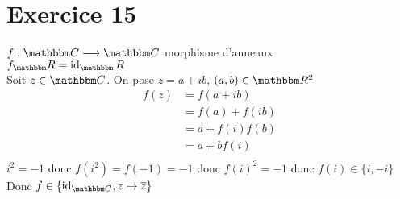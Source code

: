 \part{Exercice 15}

$f: \C \longrightarrow \C $ morphisme d'anneaux\\
$f_\R = \id_\R$\\
Soit $z \in \C$. On pose $z = a+ib$, $(a,b) \in \R^2$ \\
\begin{align*}
	f(z) &= f(a+ib) \\
	&= f(a) + f(ib) \\
	&= a + f(i) f(b) \\
	&= a + bf(i) \\
\end{align*}
$i^2 = -1$ donc $f\left(i^2\right) = f(-1) = -1$ donc $f(i)^2 = -1$ donc $f(i) \in \{i, -i\}$ \\
Donc $f \in \{\id_{\C}, z \mapsto \overline{z}\}$
